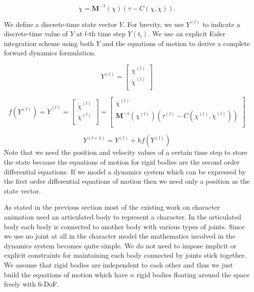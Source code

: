 \documentclass[a4paper,10pt]{article}
\begin{document}
\begin{equation}
\ddot\chi =\mathbf{M}^{-1}(\chi) ( \tau - C(\chi,\dot\chi) ).
\end{equation}

We define a discrete-time state vector $Y$. For brevity, we use $Y^{(l)}$
to indicate a discrete-time value of $Y$ at $l$-th time step $Y(t_l)$.
We use an explicit Euler integration
scheme using both $Y$ and the equations of motion to derive a complete
forward dynamics formulation.

\begin{equation}
Y^{(l)} =
\left[ {\begin{array}{cc}
 \chi^{(l)}   \\
 \dot\chi^{(l)}   \\
 \end{array} } \right]
\end{equation}

\begin{equation}
f(Y^{(l)})=\dot{Y}^{(l)}
=
\left[ {\begin{array}{cc}
 \dot\chi^{(l)}   \\
 \ddot\chi^{(l)}   \\
 \end{array} } \right]
 =
\left[ {\begin{array}{cc}
 \dot\chi^{(l)}   \\
 \mathbf{M}^{-1}(\chi^{(l)}) ( \tau^{(l)} - C(\chi^{(l)},\dot\chi^{(l)}) )   \\
 \end{array} } \right]
\end{equation}

\begin{equation}
Y^{(l+1)}=Y^{(l)}+hf(Y^{(l)})
\end{equation}
Note that we need the position and velocity values of a certain time step
to store the state because the equations of motion for rigid bodies
are the second order differential equations.
If we model a dynamics system
which can be expressed by the first order differential equations of motion
then we need only a position as the state vector.



As stated in the previous section most of the existing work on
character animation used an articulated body to represent a character.
In the articulated body each body is connected to another body with
various types of joints. Since we use no joint at all in the character
model the mathematics involved in the dynamics system becomes quite
simple. We do not need to impose implicit or explicit constraints for
maintaining each body connected by joints stick together.
We assume that rigid bodies are independent to each other and thus we just build the
equations of motion which have $n$ rigid bodies floating around the
space freely with 6-DoF.
\end{document}
